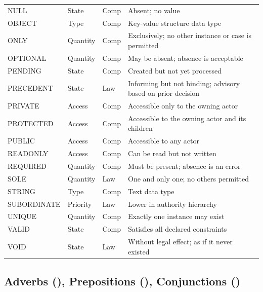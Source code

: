 \documentclass{article}
\begin{document}
\begin{tabular}{lllp{7cm}}
NULL & State & Comp & Absent; no value \\
OBJECT & Type & Comp & Key-value structure data type \\
ONLY & Quantity & Comp & Exclusively; no other instance or case is permitted \\
OPTIONAL & Quantity & Comp & May be absent; absence is acceptable \\
PENDING & State & Comp & Created but not yet processed \\
PRECEDENT & State & Law & Informing but not binding; advisory based on prior decision \\
PRIVATE & Access & Comp & Accessible only to the owning actor \\
PROTECTED & Access & Comp & Accessible to the owning actor and its children \\
PUBLIC & Access & Comp & Accessible to any actor \\
READONLY & Access & Comp & Can be read but not written \\
REQUIRED & Quantity & Comp & Must be present; absence is an error \\
SOLE & Quantity & Law & One and only one; no others permitted \\
STRING & Type & Comp & Text data type \\
SUBORDINATE & Priority & Law & Lower in authority hierarchy \\
UNIQUE & Quantity & Comp & Exactly one instance may exist \\
VALID & State & Comp & Satisfies all declared constraints \\
VOID & State & Law & Without legal effect; as if it never existed \\
\bottomrule
\end{tabular}
\normalsize

\subsection{Adverbs (\VocabAdverbs), Prepositions (\VocabPrepositions), Conjunctions (\VocabConjunctions)}
\end{document}
